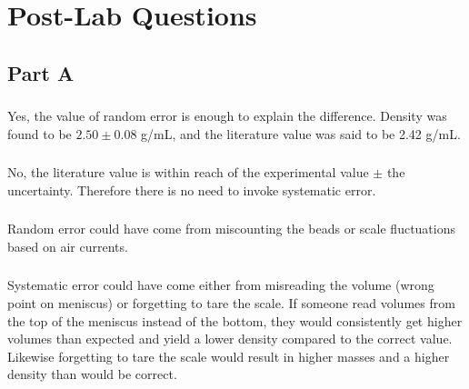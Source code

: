 \documentclass{article}
\begin{document}
\section{Post-Lab Questions}
    \subsection{Part A}
        \subsubsection{}
            \paragraph{} Yes, the value of random error is enough to explain the difference. Density was found to be $2.50 \pm 0.08$ g/mL, and the literature value was said to be 2.42 g/mL.
        \subsubsection{}
            \paragraph{} No, the literature value is within reach of the experimental value $\pm$ the uncertainty. Therefore there is no need to invoke systematic error.
        \subsubsection{}
            \paragraph{} Random error could have come from miscounting the beads or scale fluctuations based on air currents.
        \subsubsection{}
            \paragraph{} Systematic error could have come either from misreading the volume (wrong point on meniscus) or forgetting to tare the scale. If someone read volumes from the top of the meniscus instead of the bottom, they would consistently get higher volumes than expected and yield a lower density compared to the correct value. Likewise forgetting to tare the scale would result in higher masses and a higher density than would be correct.
\end{document}
